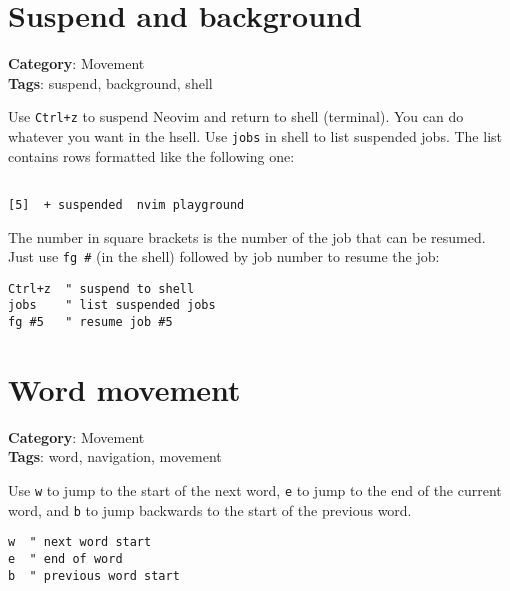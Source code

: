 {{{{{{{\section{Suspend and background}

\textbf{Category}: Movement\\ \textbf{Tags}: suspend, background, shell
\vspace{0.5cm}

Use {\footnotesize \Verb§Ctrl+z§} to suspend Neovim and return to shell (terminal). You can do whatever you want in the hsell. Use {\footnotesize \Verb§jobs§} in shell to list suspended jobs. The list contains rows formatted like the following one:

\begin{Exa*}{}
\begin{Verbatim}[fontsize=\footnotesize, breaklines, breakanywhere]

[5]  + suspended  nvim playground
\end{Verbatim}
\end{Exa*}

The number in square brackets is the number of the job that can be resumed. Just use {\footnotesize \Verb§fg #§} (in the shell) followed by job number to resume the job:

\begin{Exa*}{}
\begin{Verbatim}[fontsize=\footnotesize, breaklines, breakanywhere]
Ctrl+z  " suspend to shell
jobs    " list suspended jobs
fg #5   " resume job #5
\end{Verbatim}
\end{Exa*}

\section{Word movement}

\textbf{Category}: Movement\\ \textbf{Tags}: word, navigation, movement
\vspace{0.5cm}

Use {\footnotesize \Verb§w§} to jump to the start of the next word, {\footnotesize \Verb§e§} to jump to the end of the current word, and {\footnotesize \Verb§b§} to jump backwards to the start of the previous word.

\begin{Exa*}{}
\begin{Verbatim}[fontsize=\footnotesize, breaklines, breakanywhere]
w  " next word start
e  " end of word
b  " previous word start
\end{Verbatim}
\end{Exa*}

}}}}}}}
